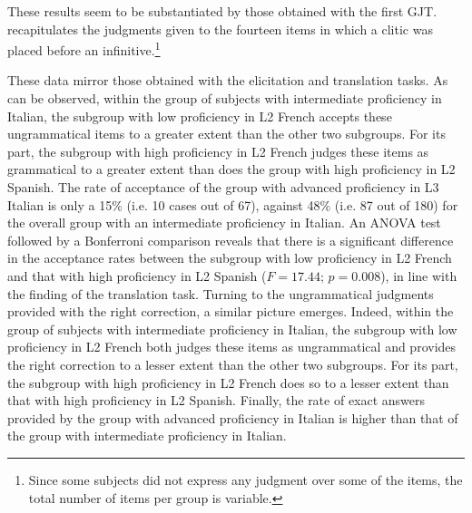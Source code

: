 \documentclass[output=paper,modfonts,nonflat,newtxmath]{langsci/langscibook}
\begin{document}
These results seem to be substantiated by those obtained with the first GJT.  recapitulates the judgments given to the fourteen items in which a clitic was placed before an infinitive.\footnote{Since some subjects did not express any judgment over some of the items, the total number of items per group is variable.}

\begin{table}
\caption{\label{tab:sciutti:7} {Judgments} {on} {items} {including} {a} {clitic} {placed} {before} {an} {infinitive}}
\end{table}

These data mirror those obtained with the elicitation and translation tasks. As can be observed, within the group of subjects with intermediate proficiency in Italian, the subgroup with low proficiency in L2 French accepts these ungrammatical items to a greater extent than the other two subgroups. For its part, the subgroup with high proficiency in L2 French judges these items as grammatical to a greater extent than does the group with high proficiency in L2 Spanish. The rate of acceptance of the group with advanced proficiency in L3 Italian is only a 15\% (i.e. 10 cases out of 67), against 48\% (i.e. 87 out of 180) for the overall group with an intermediate proficiency in Italian. An ANOVA test followed by a Bonferroni comparison reveals that there is a significant difference in the acceptance rates between the subgroup with low proficiency in L2 French and that with high proficiency in L2 Spanish ($F = 17.44$; $p = 0.008$), in line with the finding of the translation task. Turning to the ungrammatical judgments provided with the right correction, a similar picture emerges. Indeed, within the group of subjects with intermediate proficiency in Italian, the subgroup with low proficiency in L2 French both judges these items as ungrammatical and provides the right correction to a lesser extent than the other two subgroups. For its part, the subgroup with high proficiency in L2 French does so to a lesser extent than that with high proficiency in L2 Spanish. Finally, the rate of exact answers provided by the group with advanced proficiency in Italian is higher than that of the group with intermediate proficiency in Italian.
\end{document}
